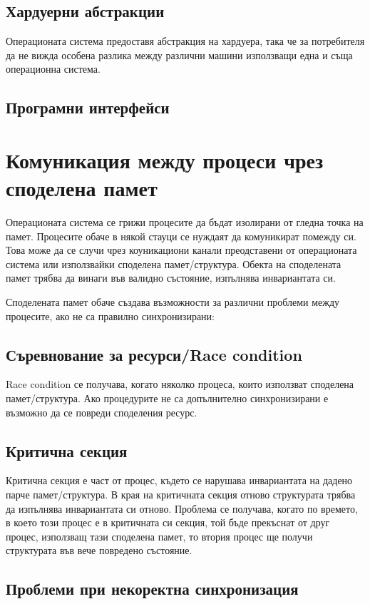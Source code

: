 \documentclass[fleqn,12pt]{article}
\begin{document}
\subsection{Хардуерни абстракции}
    Операционата система предоставя абстракция на хардуера, така че за потребителя да не вижда особена разлика между различни машини използващи една и съща операционна система.


\subsection{Програмни интерфейси}



\section{Комуникация между процеси чрез споделена памет}
    Операционата система се грижи процесите да бъдат изолирани от гледна точка на памет. Процесите обаче в някой стауци се нуждаят да комуникират помежду си. Това може да се случи чрез коуникациони канали преодставени от операционата система или използвайки споделена памет/структура. Обекта на споделената памет трябва да винаги във валидно състояние, изпълнява инвариантата си.
    
    Споделената памет обаче създава възможности за различни проблеми между процесите, ако не са правилно синхронизирани:


\subsection{Съревнование за ресурси/Race condition}
    Race condition се получава, когато няколко процеса, които използват споделена памет/структура. Ако процедурите не са допълнително синхронизирани е възможно да се повреди споделения ресурс.


\subsection{Критична секция}
    Критична секция е част от процес, където се нарушава инвариантата на дадено парче памет/структура. В края на критичната секция отново структурата трябва да изпълнява инвариантата си отново. Проблема се получава, когато по времето, в което този процес е в критичната си секция, той бъде прекъснат от друг процес, използващ тази споделена памет, то втория процес ще получи структурата във вече повредено състояние.


\subsection{Проблеми при некоректна синхронизация}
\end{document}

